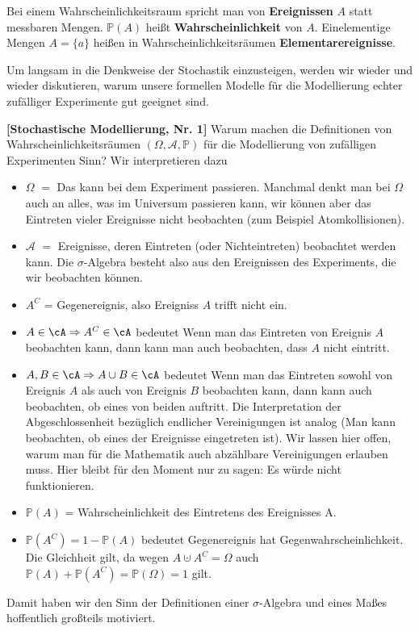 \begin{bem} 
	Bei einem Wahrscheinlichkeitsraum spricht man von \textbf{Ereignissen} $A$ statt messbaren Mengen. $\mathbb P(A)$ heißt \textbf{Wahrscheinlichkeit} von $A$. Einelementige Mengen $A = \{a\}$ heißen in Wahrscheinlichkeitsräumen \textbf{Elementarereignisse}.
\end{bem}

Um langsam in die Denkweise der Stochastik einzusteigen, werden wir wieder und wieder diskutieren, warum unsere formellen Modelle f\"ur die Modellierung echter zuf\"alliger Experimente gut geeignet sind. 

\begin{disc} \label{N1} \textbf{[Stochastische Modellierung, Nr. 1]}
	Warum machen die Definitionen von Wahrscheinlichkeitsräumen $(\Omega, \mathcal A, \mathbb P)$ für die Modellierung von zufälligen Experimenten Sinn? Wir interpretieren dazu
	\begin{itemize}
		\item $\Omega$ $=$ \glqq Das kann bei dem Experiment passieren\grqq. Manchmal denkt man bei $\Omega$ auch an alles, was im Universum passieren kann, wir k\"onnen aber das Eintreten vieler Ereignisse nicht beobachten (zum Beispiel Atomkollisionen). 
		\item $\mathcal A$ $=$ \glqq Ereignisse, deren Eintreten (oder Nichteintreten) beobachtet werden kann.\grqq{} Die $\sigma$-Algebra besteht also aus den Ereignissen des Experiments, die wir beobachten k\"onnen. 
		\item $A^C$ = \glqq Gegenereignis\grqq, also \glqq Ereigniss $A$ trifft nicht ein\grqq.
		\item $A \in \cA \Rightarrow A^{C} \in \cA$ bedeutet \glqq Wenn man das Eintreten von Ereignis $A$ beobachten kann, dann kann man auch beobachten, dass $A$ nicht eintritt.\grqq		
		\item $A, B\in \cA \Rightarrow A\cup B\in \cA$ bedeutet \glqq Wenn man das Eintreten  sowohl von Ereignis $A$ als auch von Ereignis $B$ beobachten kann, dann kann auch beobachten, ob eines von beiden auftritt.\grqq{} Die Interpretation der Abgeschlossenheit bez\"uglich endlicher Vereinigungen ist analog (\glqq Man kann beobachten, ob eines der Ereignisse eingetreten ist\grqq). Wir lassen hier offen, warum man f\"ur die Mathematik auch abz\"ahlbare Vereinigungen erlauben muss. Hier bleibt f\"ur den Moment nur zu sagen: Es w\"urde nicht funktionieren.
				\item $\mathbb P(A)$ = \glqq Wahrscheinlichkeit des Eintretens des Ereignisses A.\grqq
		\item $\mathbb P(A^C) = 1-\mathbb P(A)$ bedeutet \glqq Gegenereignis hat Gegenwahrscheinlichkeit.\grqq{} Die Gleichheit gilt, da wegen $A\cupdot A^C=\Omega$ auch $\mathbb P(A)+\mathbb P(A^C)=\mathbb P(\Omega)=1$ gilt.
	\end{itemize}
Damit haben wir den Sinn der Definitionen einer $\sigma$-Algebra und eines Ma\ss es hoffentlich gro\ss teils motiviert.\smallskip


\end{disc}
